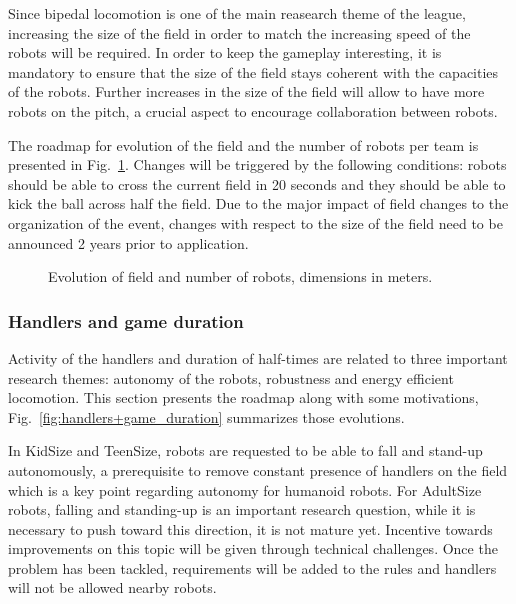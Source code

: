 \documentclass{article}
\begin{document}
Since bipedal locomotion is one of the main reasearch theme of the league,
increasing the size of the field in order to match the increasing speed of the
robots will be required.
In order to keep the gameplay interesting,
it is mandatory to ensure that the size of the field stays coherent with the
capacities of the robots.
Further increases in the size of the field will allow to have more robots on the pitch,
a crucial aspect to encourage collaboration between robots.

The roadmap for evolution of the field and the number of robots per team
is presented in Fig.~\ref{fig:field_dimensions}.
Changes will be triggered by the following conditions: robots should be able to cross
the current field in 20 seconds and they should be able to kick the ball across half the field.
Due to the major impact of field changes to the organization of the event,
changes with respect to the size of the field need to be announced 2 years prior to application.

\begin{figure}[htb]
  \centering
  
  \caption{\label{fig:field_dimensions}Evolution of field and number of robots, dimensions in meters.}
\end{figure}

\subsubsection{Handlers and game duration}
Activity of the handlers and duration of half-times are related to three important research themes:
autonomy of the robots, robustness and energy efficient locomotion.
This section presents the roadmap along with some motivations,
Fig.~\ref{fig:handlers+game_duration} summarizes those evolutions.

In KidSize and TeenSize, robots are requested to be able to fall and stand-up autonomously,
a prerequisite to remove constant presence of handlers on the field which is a
key point regarding autonomy for humanoid robots.
For AdultSize robots, falling and standing-up is an important research question,
while it is necessary to push toward this direction, it is not mature yet.
Incentive towards improvements on this topic will be given through technical challenges.
Once the problem has been tackled, requirements will be added to the rules and
handlers will not be allowed nearby robots.
\end{document}
